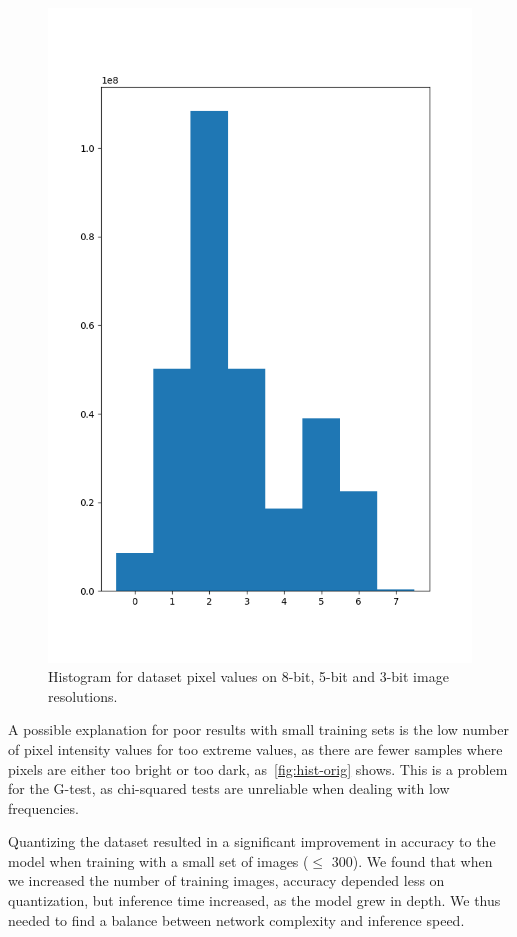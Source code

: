 \begin{figure}[h]
  \includegraphics[scale=0.3]{imgs/hist_3.png}
  \caption{Histogram for dataset pixel values on 8-bit, 5-bit and 3-bit image
    resolutions.\label{fig:hist-orig}}
\end{figure}

A possible explanation for poor results with small training sets is the low number of pixel
intensity values for too extreme values, as there are fewer samples where pixels are either too
bright or too dark, as~\autoref{fig:hist-orig} shows. This is a problem for the G-test, as
chi-squared tests are unreliable when dealing with low frequencies.

Quantizing the dataset resulted in a significant improvement in accuracy to the model when training
with a small set of images ($\leq$ 300). We found that when we increased the number of training
images, accuracy depended less on quantization, but inference time increased, as the model grew in
depth. We thus needed to find a balance between network complexity and inference speed.

